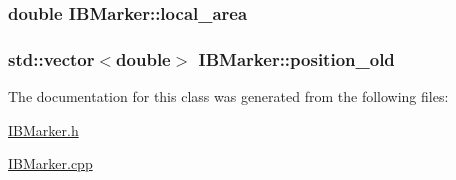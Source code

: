 \subsubsection[{\texorpdfstring{local\+\_\+area}{local_area}}]{\setlength{\rightskip}{0pt plus 5cm}double I\+B\+Marker\+::local\+\_\+area\hspace{0.3cm}{\ttfamily [protected]}}\hypertarget{class_i_b_marker_aa332dcba1676eae4fbb6d0fa6caca809}{}\label{class_i_b_marker_aa332dcba1676eae4fbb6d0fa6caca809}
\subsubsection[{\texorpdfstring{position\+\_\+old}{position_old}}]{\setlength{\rightskip}{0pt plus 5cm}std\+::vector$<$double$>$ I\+B\+Marker\+::position\+\_\+old\hspace{0.3cm}{\ttfamily [protected]}}\hypertarget{class_i_b_marker_a6a55fe2293f288ae339036ea4a3bc7df}{}\label{class_i_b_marker_a6a55fe2293f288ae339036ea4a3bc7df}


The documentation for this class was generated from the following files\+:\begin{DoxyCompactItemize}
\item 
\hyperlink{_i_b_marker_8h}{I\+B\+Marker.\+h}\item 
\hyperlink{_i_b_marker_8cpp}{I\+B\+Marker.\+cpp}\end{DoxyCompactItemize}
